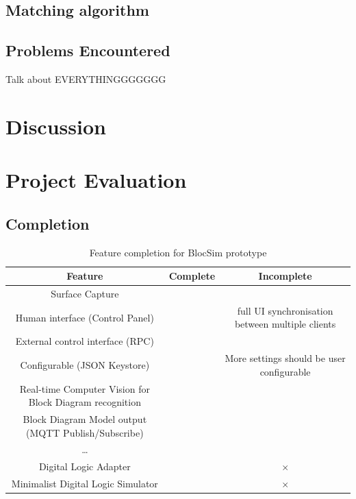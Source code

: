 \documentclass[titlesmallcaps, examinerscopy, copyrightpage]{uqthesis}
\newcommand{\tick}{\checkmark}
\newcommand{\gtick}{\color{ForestGreen} \tick }
\newcommand{\cross}{$\times$ }
\newcommand{\rcross}{\color{red} \cross }
\begin{document}
\section{Matching algorithm}



\section{Problems Encountered}





Talk about EVERYTHINGGGGGGG

\chapter{Discussion}





\chapter{Project Evaluation}




\section{Completion}



\begin{table}[ht!]
	\center
	\begin{tabular}{c|c|c}
		\hline
		Feature & Complete & Incomplete \\
		\hline
		Surface Capture & \gtick & \\
		Human interface (Control Panel) & \gtick & full UI synchronisation between multiple clients \\
		External control interface (RPC) & \gtick & \\
		Configurable (JSON Keystore) & \gtick & More settings should be user configurable \\
		Real-time Computer Vision for \newline Block Diagram recognition & \gtick & \\
		Block Diagram Model output \newline (MQTT Publish/Subscribe) & \gtick & \\
		\ldots & & \\
		Digital Logic Adapter & & \rcross \\
		Minimalist Digital Logic Simulator & & \rcross \\
		\hline
	\end{tabular}
	\caption{Feature completion for BlocSim prototype}
	\label{tab:completion}
\end{table} 
\end{document}
